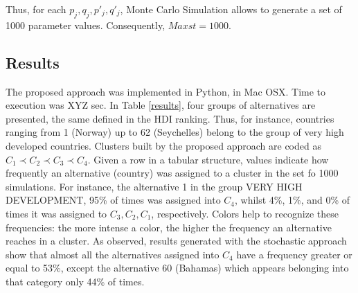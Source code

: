 \documentclass[]{elsarticle}
\theoremstyle{definition}
\begin{document}
\noindent
Thus, for each $p_j, q_j, p'_j, q'_j$, Monte Carlo Simulation allows to generate a set of 1000 parameter values. Consequently, $Maxst=1000$.  

\subsection{Results}

The proposed approach was implemented in Python, in Mac OSX. Time to execution was XYZ sec.  In Table \ref{results}, four groups of alternatives  are presented, the same defined in the HDI ranking.  Thus, for instance,  countries ranging from  1 (Norway) up to 62 (Seychelles) belong to the group of very high developed countries. Clusters built by the proposed approach are coded as $C_1 \prec  C_2 \prec C_3 \prec C_4$.  Given a row in a tabular structure, values indicate how frequently an alternative (country) was assigned to a cluster in the set fo 1000 simulations.  For instance, the alternative 1 in the group VERY HIGH DEVELOPMENT, 95\% of times was assigned into $C_4$, whilst 4\%, 1\%, and 0\% of times it was assigned to $C_3, C_2, C_1$, respectively.  Colors help to recognize these frequencies: the more intense a color, the higher the frequency an alternative reaches in a cluster.  As observed,  results generated with the stochastic approach show that almost all the alternatives assigned into $C_4$ have a frequency greater or equal to 53\%, except the alternative 60 (Bahamas) which appears belonging into that category only 44\% of times.  
\end{document}
